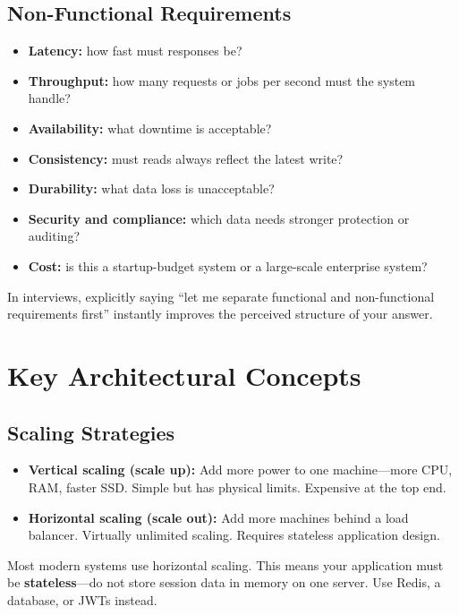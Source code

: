 \documentclass[12pt, a4paper, oneside]{book}
\begin{document}
\subsection{Non-Functional Requirements}
\begin{itemize}[leftmargin=2em]
    \item \textbf{Latency:} how fast must responses be?
    \item \textbf{Throughput:} how many requests or jobs per second must the system handle?
    \item \textbf{Availability:} what downtime is acceptable?
    \item \textbf{Consistency:} must reads always reflect the latest write?
    \item \textbf{Durability:} what data loss is unacceptable?
    \item \textbf{Security and compliance:} which data needs stronger protection or auditing?
    \item \textbf{Cost:} is this a startup-budget system or a large-scale enterprise system?
\end{itemize}

\begin{examtipbox}
In interviews, explicitly saying ``let me separate functional and non-functional requirements first'' instantly improves the perceived structure of your answer.
\end{examtipbox}

\section{Key Architectural Concepts}

\subsection{Scaling Strategies}

\begin{itemize}[leftmargin=2em]
    \item \textbf{Vertical scaling (scale up):} Add more power to one machine---more CPU, RAM, faster SSD. Simple but has physical limits. Expensive at the top end.
    \item \textbf{Horizontal scaling (scale out):} Add more machines behind a load balancer. Virtually unlimited scaling. Requires stateless application design.
\end{itemize}

\begin{notebox}
Most modern systems use horizontal scaling. This means your application must be \textbf{stateless}---do not store session data in memory on one server. Use Redis, a database, or JWTs instead.
\end{notebox}
\end{document}
